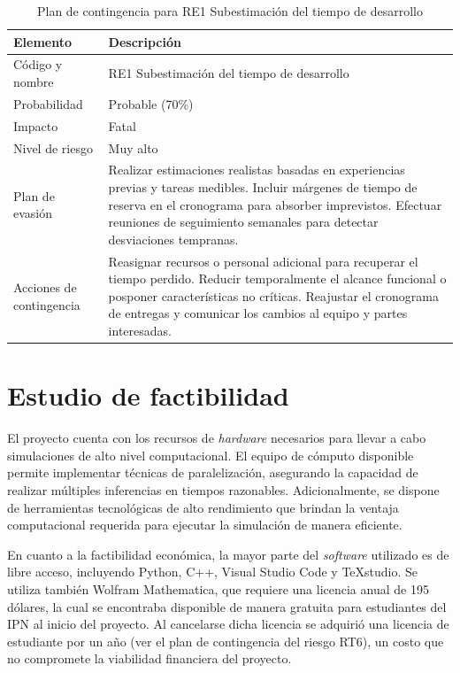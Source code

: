 \begin{table}[H]
	\centering
	\renewcommand{\arraystretch}{1.2}
	\setlength{\tabcolsep}{4pt}
	\begin{tabular}{|p{}|p{}|}
		\hline
		\textbf{Elemento} & \textbf{Descripción} \\ \hline
		Código y nombre & RE1 Subestimación del tiempo de desarrollo \\ \hline
		Probabilidad & Probable (70\%) \\ \hline
		Impacto & Fatal \\ \hline
		Nivel de riesgo & Muy alto \\ \hline
		Plan de evasión & 
		Realizar estimaciones realistas basadas en experiencias previas y tareas medibles. 
		Incluir márgenes de tiempo de reserva en el cronograma para absorber imprevistos. 
		Efectuar reuniones de seguimiento semanales para detectar desviaciones tempranas. \\ \hline
		Acciones de contingencia & 
		Reasignar recursos o personal adicional para recuperar el tiempo perdido. 
		Reducir temporalmente el alcance funcional o posponer características no críticas. 
		Reajustar el cronograma de entregas y comunicar los cambios al equipo y partes interesadas. \\ \hline
	\end{tabular}
	\caption{Plan de contingencia para RE1 Subestimación del tiempo de desarrollo}
	\label{table:contingencia_subestimacion}
\end{table}

\section{Estudio de factibilidad}

El proyecto cuenta con los recursos de \textit{hardware} necesarios para llevar a cabo simulaciones de alto nivel computacional. El equipo de cómputo disponible permite implementar técnicas de paralelización, asegurando la capacidad de realizar múltiples inferencias en tiempos razonables. Adicionalmente, se dispone de herramientas tecnológicas de alto rendimiento que brindan la ventaja computacional requerida para ejecutar la simulación de manera eficiente.

En cuanto a la factibilidad económica, la mayor parte del \textit{software} utilizado es de libre acceso, incluyendo Python, C++, Visual Studio Code y TeXstudio. Se utiliza también Wolfram Mathematica, que requiere una licencia anual de 195 dólares, la cual se encontraba disponible de manera gratuita para estudiantes del IPN al inicio del proyecto. Al cancelarse dicha licencia se adquirió una licencia de estudiante por un año (ver el plan de contingencia del riesgo RT6), un costo que no compromete la viabilidad financiera del proyecto.

